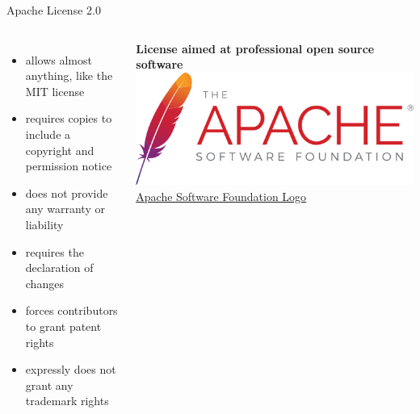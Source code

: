 \documentclass[10pt, graphics, aspectratio=169, table]{beamer}
\begin{document}
    \begin{frame}{Apache License 2.0}
        \begin{columns}
                \begin{itemize}
                    \item allows almost anything, like the MIT license
                    \item requires copies to include a copyright and permission notice
                    \item does not provide any warranty or liability
                    \item requires the declaration of changes
                    \item forces contributors to grant patent rights
                    \item expressly does not grant any trademark rights
                \end{itemize}
                \textbf{License aimed at professional open source software}
                \includegraphics[width=\textwidth]{img/Apache.png}
                \center\tiny\href{https://commons.wikimedia.org/wiki/File:ASF_Logo.svg}{Apache Software Foundation Logo}
        \end{columns}
    \end{frame}
\end{document}
